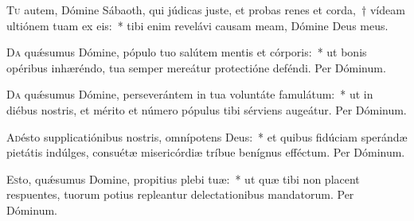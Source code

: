 \documentclass[vesperale_romanum.tex]{subfiles}
\begin{document}





\lettrine{T}{u} autem, Dómine Sábaoth, qui júdicas juste, et probas renes et corda,~† vídeam ultiónem tuam ex eis:~* tibi enim revelávi causam meam, Dómine Deus meus.


\oratio

\lettrine{D}{a} quǽsumus Dómine, pópulo tuo salútem mentis et córporis:~* ut bonis opéribus inhæréndo, tua semper mereátur prote\-ctióne deféndi.
Per Dóminum.




\oratio

\lettrine{D}{a} quǽsumus Dómine, perseverántem in tua voluntáte famulátum:~* ut in diébus nostris, et mérito et número pópulus tibi sérviens augeátur.
Per Dóminum.



\oratio

\lettrine{A}{d}ésto supplicatiónibus nostris, omnípotens Deus:~* et quibus fidúciam sperándæ pietátis indúlges, consuétæ misericórdiæ tríbue benígnus effé\-ctum. Per Dóminum.



\oratio

\lettrine{E}{s}to, quǽsumus Domine, propitius plebi tuæ:~* ut quæ tibi non placent respuentes, tuorum potius repleantur delectationibus mandatorum. Per Dóminum.
\end{document}

